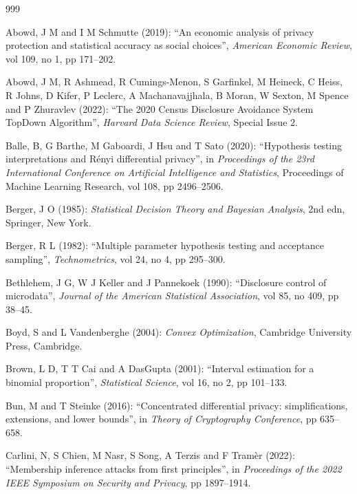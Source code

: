 \begin{thebibliography}{999}

Abowd, J M and I M Schmutte (2019): ``An economic analysis of privacy protection and statistical accuracy as social choices'', \emph{American Economic Review}, vol 109, no 1, pp 171--202.

Abowd, J M, R Ashmead, R Cumings-Menon, S Garfinkel, M Heineck, C Heiss, R Johns, D Kifer, P Leclerc, A Machanavajjhala, B Moran, W Sexton, M Spence and P Zhuravlev (2022): ``The 2020 Census Disclosure Avoidance System TopDown Algorithm'', \emph{Harvard Data Science Review}, Special Issue 2.

Balle, B, G Barthe, M Gaboardi, J Hsu and T Sato (2020): ``Hypothesis testing interpretations and R\'enyi differential privacy'', in \emph{Proceedings of the 23rd International Conference on Artificial Intelligence and Statistics}, Proceedings of Machine Learning Research, vol 108, pp 2496--2506.

Berger, J O (1985): \emph{Statistical Decision Theory and Bayesian Analysis}, 2nd edn, Springer, New York.

Berger, R L (1982): ``Multiple parameter hypothesis testing and acceptance sampling'', \emph{Technometrics}, vol 24, no 4, pp 295--300.

Bethlehem, J G, W J Keller and J Pannekoek (1990): ``Disclosure control of microdata'', \emph{Journal of the American Statistical Association}, vol 85, no 409, pp 38--45.

Boyd, S and L Vandenberghe (2004): \emph{Convex Optimization}, Cambridge University Press, Cambridge.

Brown, L D, T T Cai and A DasGupta (2001): ``Interval estimation for a binomial proportion'', \emph{Statistical Science}, vol 16, no 2, pp 101--133.

Bun, M and T Steinke (2016): ``Concentrated differential privacy: simplifications, extensions, and lower bounds'', in \emph{Theory of Cryptography Conference}, pp 635--658.

Carlini, N, S Chien, M Nasr, S Song, A Terzis and F Tram\`er (2022): ``Membership inference attacks from first principles'', in \emph{Proceedings of the 2022 IEEE Symposium on Security and Privacy}, pp 1897--1914.


\end{thebibliography}

